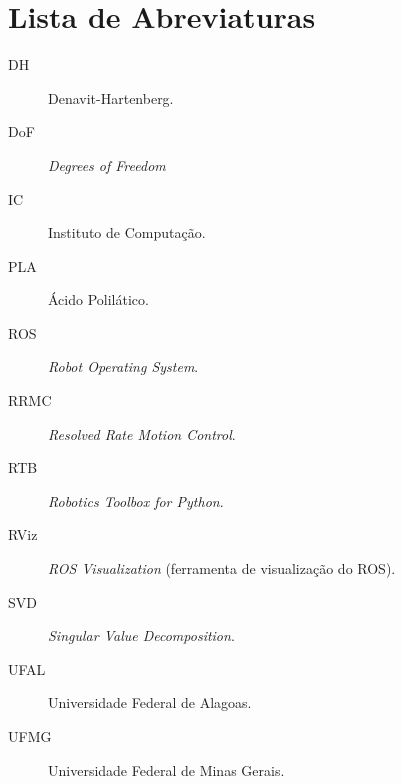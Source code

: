 \chapter*{Lista de Abreviaturas}

\begin{description}
  \item[DH] \quad Denavit-Hartenberg.
  \item[DoF] \quad \emph{Degrees of Freedom}
  \item[IC] \quad Instituto de Computação.
  \item[PLA] \quad Ácido Polilático.
  \item[ROS] \quad \emph{Robot Operating System}.
  \item[RRMC] \quad \emph{Resolved Rate Motion Control}.
  \item[RTB] \quad \emph{Robotics Toolbox for Python}.
  \item[RViz] \quad \emph{ROS Visualization} (ferramenta de visualização do ROS).
  \item[SVD] \quad \emph{Singular Value Decomposition}.
  \item[UFAL] \quad Universidade Federal de Alagoas.
  \item[UFMG] \quad Universidade Federal de Minas Gerais.  
\end{description}